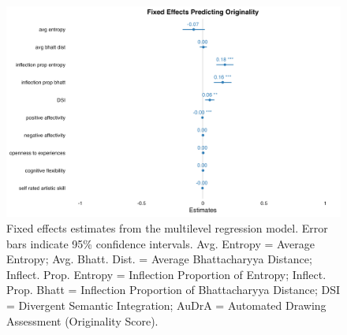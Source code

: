 \documentclass[../MA_Thesis.tex]{subfiles}
\begin{document}
\begin{figure}[H]
  \centering
  \includegraphics[width=\textwidth]{../analysis/results/main_results/multilevel_regression/fixed_effects_plott.png}
  \caption{Fixed effects estimates from the multilevel regression model. Error bars indicate 95\% confidence intervals. Avg. Entropy = Average Entropy; Avg. Bhatt. Dist. = Average Bhattacharyya Distance; Inflect. Prop. Entropy = Inflection Proportion of Entropy; Inflect. Prop. Bhatt = Inflection Proportion of Bhattacharyya Distance; DSI = Divergent Semantic Integration; AuDrA = Automated Drawing Assessment (Originality Score).}
  \label{fig:coef_plot}
\end{figure}
\end{document}
